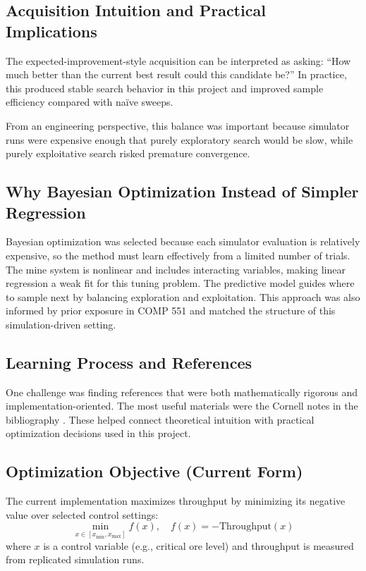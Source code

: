 \documentclass[11pt]{article}
\begin{document}
\subsection{Acquisition Intuition and Practical Implications}
The expected-improvement-style acquisition can be interpreted as asking: ``How much better than the current best result could this candidate be?'' In practice, this produced stable search behavior in this project and improved sample efficiency compared with naïve sweeps.

From an engineering perspective, this balance was important because simulator runs were expensive enough that purely exploratory search would be slow, while purely exploitative search risked premature convergence.

\subsection{Why Bayesian Optimization Instead of Simpler Regression}
Bayesian optimization was selected because each simulator evaluation is relatively expensive, so the method must learn effectively from a limited number of trials. The mine system is nonlinear and includes interacting variables, making linear regression a weak fit for this tuning problem. The predictive model guides where to sample next by balancing exploration and exploitation. This approach was also informed by prior exposure in COMP 551 and matched the structure of this simulation-driven setting.

\subsection{Learning Process and References}
One challenge was finding references that were both mathematically rigorous and implementation-oriented. The most useful materials were the Cornell notes in the bibliography \cite{cornell4780note15,cornell4787lec16,cornell4787lec17}. These helped connect theoretical intuition with practical optimization decisions used in this project.

\subsection{Optimization Objective (Current Form)}
The current implementation maximizes throughput by minimizing its negative value over selected control settings:
\[
\min_{x \in [x_{\min}, x_{\max}]} f(x), \quad f(x) = -\text{Throughput}(x)
\]
where $x$ is a control variable (e.g., critical ore level) and throughput is measured from replicated simulation runs.
\end{document}
